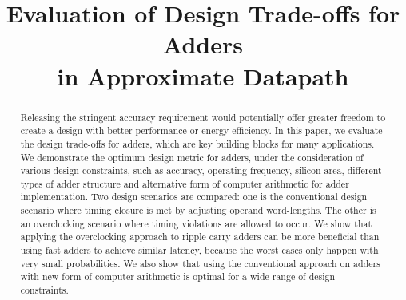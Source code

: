 \documentclass[10pt, conference, compsocconf]{IEEEtran}
\begin{document}
\title{Evaluation of Design Trade-offs for Adders\\ in Approximate Datapath}

\author{
\vspace{1ex}
}


\maketitle


\begin{abstract}
Releasing the stringent accuracy requirement would potentially offer greater freedom to create a design with better performance or energy efficiency. In this paper, we evaluate the design trade-offs for adders, which are key building blocks for many applications. We demonstrate the optimum design metric for adders, under the consideration of various design constraints, such as accuracy, operating frequency, silicon area, different types of adder structure and alternative form of computer arithmetic for adder implementation. Two design scenarios are compared: one is the conventional design scenario where timing closure is met by adjusting operand word-lengths. The other is an overclocking scenario where timing violations are allowed to occur. We show that applying the overclocking approach to ripple carry adders can be more beneficial than using fast adders to achieve similar latency, because the worst cases only happen with very small probabilities. We also show that using the conventional approach on adders with new form of computer arithmetic is optimal for a wide range of design constraints. 



\end{abstract}
\end{document}
